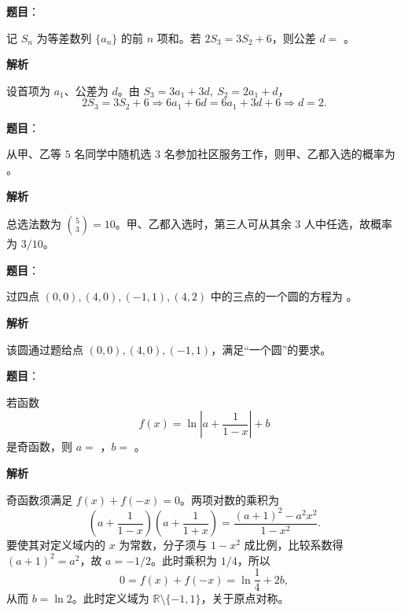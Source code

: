 
\begin{answer}

\textbf{题目}：

记 $S_n$ 为等差数列 $\{a_n\}$ 的前 $n$ 项和。若 $2S_3=3S_2+6$，则公差 $d=$ \gkblank{}。

\textbf{解析}

设首项为 $a_1$、公差为 $d$。由 $S_3=3a_1+3d,\ S_2=2a_1+d$，
\nopagebreak[4]
\[
2S_3=3S_2+6
\Longrightarrow 6a_1+6d=6a_1+3d+6
\Longrightarrow d=2.
\]


\end{answer}
\begin{answer}

\textbf{题目}：

从甲、乙等 $5$ 名同学中随机选 $3$ 名参加社区服务工作，则甲、乙都入选的概率为 \gkblank{}。

\textbf{解析}

总选法数为 $\binom53=10$。甲、乙都入选时，第三人可从其余 3 人中任选，故概率为 $3/10$。


\end{answer}
\begin{answer}

\textbf{题目}：

过四点 $(0,0),(4,0),(-1,1),(4,2)$ 中的三点的一个圆的方程为 \gkblank{}。

\textbf{解析}

该圆通过题给点 $(0,0),(4,0),(-1,1)$，满足“一个圆”的要求。


\end{answer}
\begin{answer}

\textbf{题目}：

若函数
\nopagebreak[4]
\[
f(x)=\ln\left|a+\frac{1}{1-x}\right|+b
\]
是奇函数，则 $a=$ \gkblank{}，$b=$ \gkblank{}。

\textbf{解析}

奇函数须满足 $f(x)+f(-x)=0$。两项对数的乘积为
\nopagebreak[4]
\[
\left(a+\frac1{1-x}\right)\left(a+\frac1{1+x}\right)
=\frac{(a+1)^2-a^2x^2}{1-x^2}.
\]
要使其对定义域内的 $x$ 为常数，分子须与 $1-x^2$ 成比例，比较系数得 $(a+1)^2=a^2$，故 $a=-1/2$。此时乘积为 $1/4$，所以
\nopagebreak[4]
\[
0=f(x)+f(-x)=\ln\frac14+2b,
\]
从而 $b=\ln2$。此时定义域为 $\mathbb R\setminus\{-1,1\}$，关于原点对称。


\end{answer}

